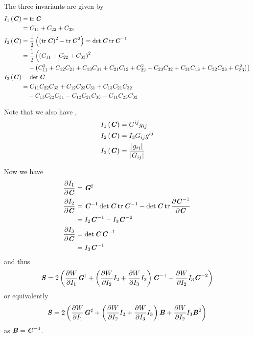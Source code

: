 The three invariants are given by
\begin{equation}
  \begin{split}
     I_{1}\left( \boldsymbol{\mathit{C}} \right)  &= \operatorname{tr}\boldsymbol{\mathit{C}} \\
    &= C_{11} + C_{22} + C_{33} \\
     I_{2}\left( \boldsymbol{\mathit{C}} \right)  &=
    \dfrac{1}{2}\left( \left( \operatorname{tr}\boldsymbol{\mathit{C}} \right)^{2}-\operatorname{tr}\boldsymbol{\mathit{C}}^{2} \right)
    = \det \boldsymbol{\mathit{C}}\operatorname{tr}{\boldsymbol{\mathit{C}}}^{-1}\\
    &=
    \dfrac{1}{2}\left(\left( C_{11}+C_{22}+C_{33} \right)^{2}\right. \\
      & \quad\left.-\left( C_{11}^{2}+C_{12}C_{21}+C_{13}C_{31}+
        C_{21}C_{12}+C_{22}^{2}+C_{23}C_{32}+C_{31}C_{13}+C_{32}C_{23}+C_{33}^{2} \right)\right) \\
     I_{3}\left( \boldsymbol{\mathit{C}} \right)  &= \det \boldsymbol{\mathit{C}} \\
    &=C_{11}C_{22}C_{33}+C_{12}C_{23}C_{31}+C_{13}C_{21}C_{32}\\
    &\quad-C_{13}C_{22}C_{31}-C_{12}C_{21}C_{33}-C_{11}C_{23}C_{32}
  \end{split}
\end{equation}

Note that we also have \citep{adkins:1954},
\begin{equation}
 \begin{split}
     I_{1}\left( \boldsymbol{\mathit{C}} \right)  &= G^{ij}g_{ij} \\
     I_{2}\left( \boldsymbol{\mathit{C}} \right)  &= I_{3}G_{ij}g^{ij}\\
     I_{3}\left( \boldsymbol{\mathit{C}} \right)  &= \frac{\left| g_{ij} \right|}{\left| G_{ij} \right|}
  \end{split}  
\end{equation}

Now we have
\begin{align}
   \dfrac{\partial I_{1}}{\partial \boldsymbol{\mathit{C}}} &= \boldsymbol{\mathit{G}}^{\sharp} \\
   \dfrac{\partial I_{2}}{\partial \boldsymbol{\mathit{C}}} &={\boldsymbol{\mathit{C}}}^{-1}\det \boldsymbol{\mathit{C}}\operatorname{tr}{\boldsymbol{\mathit{C}}}^{-1}-\det \boldsymbol{\mathit{C}}\operatorname{tr} \dfrac{\partial {\ensuremath{\boldsymbol{\mathit{C}}}}^{-1}}{\partial \boldsymbol{\mathit{C}}} \\
  &=I_{2}{\boldsymbol{\mathit{C}}}^{-1}-I_{3} {\boldsymbol{\mathit{C}}}^{-2}  \\
   \dfrac{\partial I_{3}}{\partial \boldsymbol{\mathit{C}}} &=\det \boldsymbol{\mathit{C}}{\boldsymbol{\mathit{C}}}^{-1} \\
  &= I_{3}{\boldsymbol{\mathit{C}}}^{-1} 
\end{align}
and thus
\begin{equation}
  \boldsymbol{\mathit{S}}=2\left(  \dfrac{\partial W}{\partial I_{1}}  \boldsymbol{\mathit{G}}^{\sharp} +\left(  \dfrac{\partial W}{\partial I_{2}} I_{2}+ \dfrac{\partial W}{\partial I_{3}} I_{3} \right){\boldsymbol{\mathit{C}}}^{-1}+ \dfrac{\partial W}{\partial I_{2}} I_{3} {\boldsymbol{\mathit{C}}}^{-2}  \right)
\end{equation}
or equivalently
\begin{equation}
  \boldsymbol{\mathit{S}}=2\left(  \dfrac{\partial W}{\partial I_{1}}  \boldsymbol{\mathit{G}}^{\sharp} +\left(  \dfrac{\partial W}{\partial I_{2}} I_{2}+ \dfrac{\partial W}{\partial I_{3}} I_{3} \right)\boldsymbol{\mathit{B}}+ \dfrac{\partial W}{\partial I_{2}} I_{3}\boldsymbol{\mathit{B}}^{2} \right)
\end{equation}
as $\boldsymbol{\mathit{B}}={\boldsymbol{\mathit{C}}}^{-1}$.

